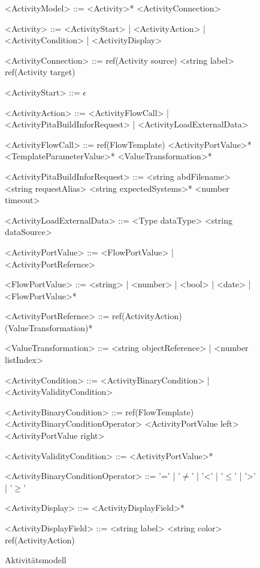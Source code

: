 \documentclass{article}
\begin{document}
    \begin{figure}[H]
        \begin{grammar}
            <ActivityModel> ::= <Activity>* <ActivityConnection>

            <Activity> ::= <ActivityStart>
            | <ActivityAction>
            | <ActivityCondition>
            | <ActivityDisplay>

            <ActivityConnection> ::= ref(Activity source) <string label> ref(Activity target)

            <ActivityStart> ::= $\epsilon$

            <ActivityAction> ::= <ActivityFlowCall>
            | <ActivityPitaBuildInforRequest>
            | <ActivityLoadExternalData>

            <ActivityFlowCall> ::= ref(FlowTemplate) <ActivityPortValue>* <TemplateParameterValue>* <ValueTransformation>*

            <ActivityPitaBuildInforRequest> ::= <string abdFilename> <string requestAlias> <string expectedSystems>* <number timeout>

            <ActivityLoadExternalData> ::= <Type dataType> <string dataSource>

            <ActivityPortValue> ::= <FlowPortValue>
            | <ActivityPortRefernce>

            <FlowPortValue> ::= <string>
            | <number>
            | <bool>
            | <date>
            | <FlowPortValue>*

            <ActivityPortRefernce> ::= ref(ActivityAction) (ValueTransformation)*

            <ValueTransformation> ::= <string objectReference>
            | <number listIndex>

            <ActivityCondition> ::= <ActivityBinaryCondition>
            | <ActivityValidityCondition>

            <ActivityBinaryCondition> ::= ref(FlowTemplate) <ActivityBinaryConditionOperator> <ActivityPortValue left> <ActivityPortValue right>

            <ActivityValidityCondition> ::= <ActivityPortValue>*

            <ActivityBinaryConditionOperator> ::= '='
            | '$\neq$' 
            | '\textless' 
            | '$\leq$' 
            | '\textgreater' 
            | '$\geq$'

            <ActivityDisplay> ::= <ActivityDisplayField>*

            <ActivityDisplayField> ::= <string label> <string color> ref(ActivityAction)
        \end{grammar}
        \caption{Aktivitätsmodell}
        \label{Aktivitätsmodell}
    \end{figure}    
    \newpage
\end{document}
